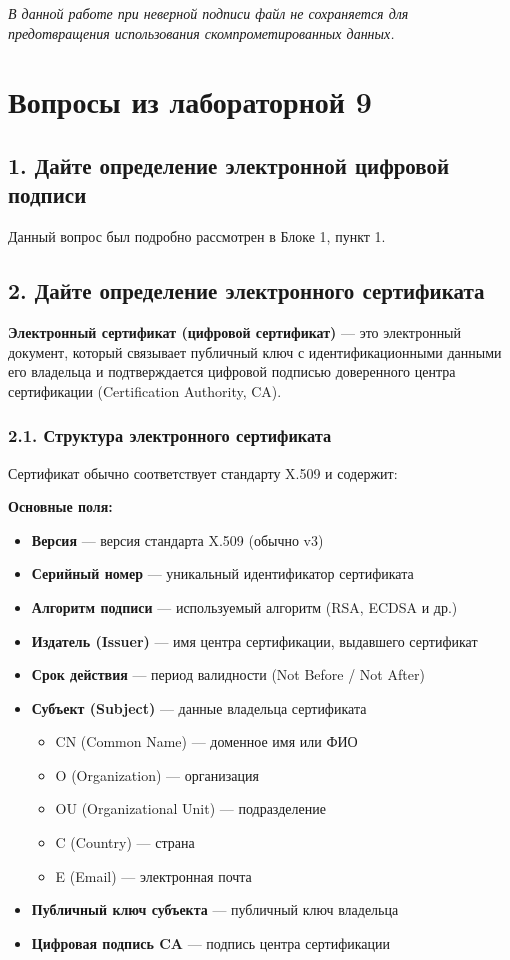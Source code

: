 \textit{В данной работе при неверной подписи файл не сохраняется для предотвращения использования скомпрометированных данных.}

\section*{Вопросы из лабораторной 9}

\subsection*{1. Дайте определение электронной цифровой подписи}

Данный вопрос был подробно рассмотрен в Блоке 1, пункт 1.

\subsection*{2. Дайте определение электронного сертификата}

\textbf{Электронный сертификат (цифровой сертификат)} — это электронный документ, который связывает публичный ключ с идентификационными данными его владельца и подтверждается цифровой подписью доверенного центра сертификации (Certification Authority, CA).

\subsubsection*{2.1. Структура электронного сертификата}

Сертификат обычно соответствует стандарту X.509 и содержит:

\textbf{Основные поля:}
\begin{itemize}
    \item \textbf{Версия} — версия стандарта X.509 (обычно v3)
    \item \textbf{Серийный номер} — уникальный идентификатор сертификата
    \item \textbf{Алгоритм подписи} — используемый алгоритм (RSA, ECDSA и др.)
    \item \textbf{Издатель (Issuer)} — имя центра сертификации, выдавшего сертификат
    \item \textbf{Срок действия} — период валидности (Not Before / Not After)
    \item \textbf{Субъект (Subject)} — данные владельца сертификата
    \begin{itemize}
        \item CN (Common Name) — доменное имя или ФИО
        \item O (Organization) — организация
        \item OU (Organizational Unit) — подразделение
        \item C (Country) — страна
        \item E (Email) — электронная почта
    \end{itemize}
    \item \textbf{Публичный ключ субъекта} — публичный ключ владельца
    \item \textbf{Цифровая подпись CA} — подпись центра сертификации
\end{itemize}

